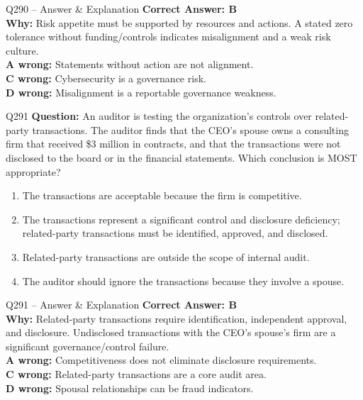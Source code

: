 \documentclass[aspectratio=169,10pt]{beamer}
\begin{document}
	\begin{frame}[t]{Q290 -- Answer \& Explanation}
		\small
		\textbf{Correct Answer: B} \\[4pt]
		\textbf{Why:} Risk appetite must be supported by resources and actions. A stated zero tolerance without funding/controls indicates misalignment and a weak risk culture. \\[4pt]
		\textbf{A wrong:} Statements without action are not alignment. \\[2pt]
		\textbf{C wrong:} Cybersecurity is a governance risk. \\[2pt]
		\textbf{D wrong:} Misalignment is a reportable governance weakness.
	\end{frame}
	
	\begin{frame}[t]{Q291}
		\small
		\textbf{Question:} An auditor is testing the organization's controls over related-party transactions. The auditor finds that the CEO's spouse owns a consulting firm that received \$3 million in contracts, and that the transactions were not disclosed to the board or in the financial statements. Which conclusion is MOST appropriate?
		\begin{enumerate}[label=\Alph*.,itemsep=1pt,topsep=2pt]
			\item The transactions are acceptable because the firm is competitive.
			\item The transactions represent a significant control and disclosure deficiency; related-party transactions must be identified, approved, and disclosed.
			\item Related-party transactions are outside the scope of internal audit.
			\item The auditor should ignore the transactions because they involve a spouse.
		\end{enumerate}
	\end{frame}
	
	\begin{frame}[t]{Q291 -- Answer \& Explanation}
		\small
		\textbf{Correct Answer: B} \\[4pt]
		\textbf{Why:} Related-party transactions require identification, independent approval, and disclosure. Undisclosed transactions with the CEO's spouse's firm are a significant governance/control failure. \\[4pt]
		\textbf{A wrong:} Competitiveness does not eliminate disclosure requirements. \\[2pt]
		\textbf{C wrong:} Related-party transactions are a core audit area. \\[2pt]
		\textbf{D wrong:} Spousal relationships can be fraud indicators.
	\end{frame}
	
\end{document}
